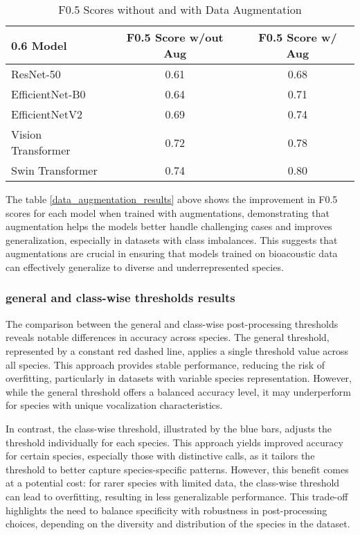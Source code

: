 \begin{table}[h]  
\begin{tabular}{|l|c|c|}{0.6\textwidth} 
\hline 
\textbf{Model} & \textbf{F0.5 Score w/out Aug} & \textbf{F0.5 Score w/ Aug} \\
\hline 
ResNet-50 & 0.61 & 0.68 \\
EfficientNet-B0 & 0.64 & 0.71 \\
EfficientNetV2 & 0.69 & 0.74 \\
Vision Transformer & 0.72 & 0.78 \\
Swin Transformer & 0.74 & 0.80 \\
\hline 
\end{tabular} 
\caption{F0.5 Scores without and with Data Augmentation} 
\label{tab:data_augmentation_results}
\end{table}

The table \ref{data_augmentation_results} above shows the improvement in F0.5 scores for each model when trained with augmentations, demonstrating that augmentation helps the models better handle challenging cases and improves generalization, especially in datasets with class imbalances. This suggests that augmentations are crucial in ensuring that models trained on bioacoustic data can effectively generalize to diverse and underrepresented species.

\subsubsection{general and class-wise thresholds results}

The comparison between the general and class-wise post-processing thresholds reveals notable differences in accuracy across species. The general threshold, represented by a constant red dashed line, applies a single threshold value across all species. This approach provides stable performance, reducing the risk of overfitting, particularly in datasets with variable species representation. However, while the general threshold offers a balanced accuracy level, it may underperform for species with unique vocalization characteristics.

In contrast, the class-wise threshold, illustrated by the blue bars, adjusts the threshold individually for each species. This approach yields improved accuracy for certain species, especially those with distinctive calls, as it tailors the threshold to better capture species-specific patterns. However, this benefit comes at a potential cost: for rarer species with limited data, the class-wise threshold can lead to overfitting, resulting in less generalizable performance. This trade-off highlights the need to balance specificity with robustness in post-processing choices, depending on the diversity and distribution of the species in the dataset.

